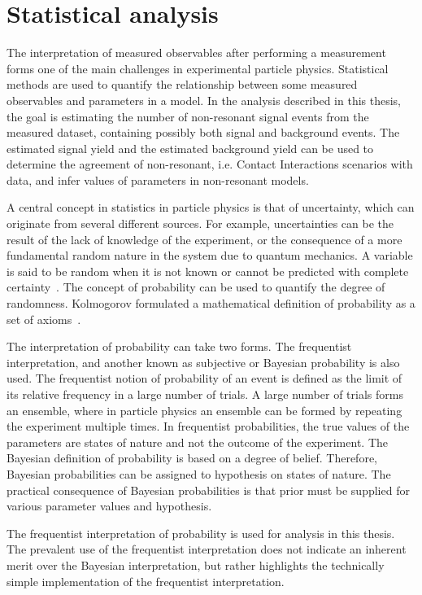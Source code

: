 \chapter{Statistical analysis}\label{chap:stats}

The interpretation of measured observables after performing a measurement forms one of the main challenges in experimental particle physics. Statistical methods are used to quantify the relationship between some measured observables and parameters in a model. In the analysis described in this thesis, the goal is estimating the number of non-resonant signal events from the measured dataset, containing possibly both signal and background events. The estimated signal yield and the estimated background yield can be used to determine the agreement of non-resonant, i.e. Contact Interactions scenarios with data, and infer values of parameters in non-resonant models. 

A central concept in statistics in particle physics is that of uncertainty, which can originate from several different sources. For example, uncertainties can be the result of the lack of knowledge of the experiment, or the consequence of a more fundamental random nature in the system due to quantum mechanics. A variable is said to be random when it is not known or cannot be predicted with complete certainty~\cite{Cowan1998}. The concept of probability can be used to quantify the degree of randomness. Kolmogorov formulated a mathematical definition of probability as a set of axioms~\cite{Kol33}. 

The interpretation of probability can take two forms. The frequentist interpretation, and another known as subjective or Bayesian probability is also used. The frequentist notion of probability of an event is defined as the limit of its relative frequency in a large number of trials. A large number of trials forms an ensemble, where in particle physics an ensemble can be formed by repeating the experiment multiple times. In frequentist probabilities, the true values of the parameters are states of nature and not the outcome of the experiment. The Bayesian definition of probability is based on a degree of belief. Therefore, Bayesian probabilities can be assigned to hypothesis on states of nature. The practical consequence of Bayesian probabilities is that prior must be supplied for various parameter values and hypothesis. 

The frequentist interpretation of probability is used for analysis in this thesis. The prevalent use of the frequentist interpretation does not indicate an inherent merit over the Bayesian interpretation, but rather highlights the technically simple implementation of the frequentist interpretation. 


